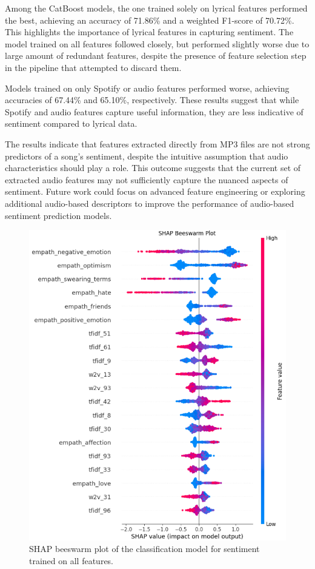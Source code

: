 Among the CatBoost models, the one trained solely on lyrical features performed
the best, achieving an accuracy of 71.86\% and a weighted F1-score of 70.72\%.
This highlights the importance of lyrical features in capturing sentiment. The
model trained on all features followed closely, but performed slightly worse
due to large amount of redundant features, despite the presence of feature
selection step in the pipeline that attempted to discard them.

Models trained on only Spotify or audio features performed worse, achieving
accuracies of 67.44\% and 65.10\%, respectively. These results suggest that
while Spotify and audio features capture useful information, they are less
indicative of sentiment compared to lyrical data. 

The results indicate that features extracted directly from MP3 files are not
strong predictors of a song's sentiment, despite the intuitive assumption that
audio characteristics should play a role. This outcome suggests that the
current set of extracted audio features may not sufficiently capture the
nuanced aspects of sentiment. Future work could focus on advanced feature
engineering or exploring additional audio-based descriptors to improve the
performance of audio-based sentiment prediction models.

\begin{center}
\begin{figure}[H]
  \centering
  \includegraphics[width=5in]{img/beeswarm_sentiment.png}
  \caption{SHAP beeswarm plot of the classification model for sentiment
  trained on all features.}
  \label{Figure:fig_bh}
\end{figure}
\end{center}

